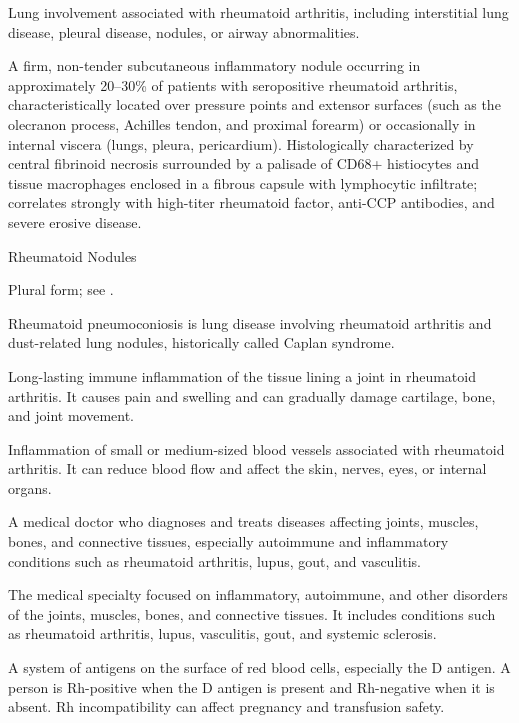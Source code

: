  Lung involvement associated with rheumatoid arthritis, including interstitial lung disease, pleural disease, nodules, or airway abnormalities.

 A firm, non-tender subcutaneous inflammatory nodule occurring in approximately 20--30\% of patients with seropositive rheumatoid arthritis, characteristically located over pressure points and extensor surfaces (such as the olecranon process, Achilles tendon, and proximal forearm) or occasionally in internal viscera (lungs, pleura, pericardium). Histologically characterized by central fibrinoid necrosis surrounded by a palisade of CD68+ histiocytes and tissue macrophages enclosed in a fibrous capsule with lymphocytic infiltrate; correlates strongly with high-titer rheumatoid factor, anti-CCP antibodies, and severe erosive disease.

\synonyms
Rheumatoid Nodules

 Plural form; see .

 Rheumatoid pneumoconiosis is lung disease involving rheumatoid arthritis and dust-related lung nodules, historically called Caplan syndrome.

 Long-lasting immune inflammation of the tissue lining a joint in rheumatoid arthritis. It causes pain and swelling and can gradually damage cartilage, bone, and joint movement.

 Inflammation of small or medium-sized blood vessels associated with rheumatoid arthritis. It can reduce blood flow and affect the skin, nerves, eyes, or internal organs.

 A medical doctor who diagnoses and treats diseases affecting joints, muscles, bones, and connective tissues, especially autoimmune and inflammatory conditions such as rheumatoid arthritis, lupus, gout, and vasculitis.

 The medical specialty focused on inflammatory, autoimmune, and other disorders of the joints, muscles, bones, and connective tissues. It includes conditions such as rheumatoid arthritis, lupus, vasculitis, gout, and systemic sclerosis.

 A system of antigens on the surface of red blood cells, especially the D antigen. A person
is Rh-positive when the D antigen is present and Rh-negative when it is absent. Rh incompatibility can affect pregnancy
and transfusion safety.

